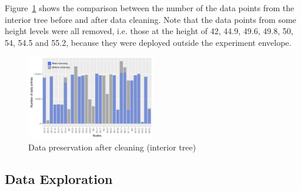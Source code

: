\documentclass[11pt]{article}
\begin{document}
Figure~\ref{fig:dataCleaning} shows the comparison between the number of the data points from the interior tree before and after data cleaning. Note that the data points from some height levels were all removed, i.e. those at the height of 42, 44.9, 49.6, 49.8, 50, 54, 54.5 and 55.2, because they were deployed outside the experiment envelope.
\begin{figure}[!htb]
  \centering
    \includegraphics[width=0.5\textwidth]{../figures/dataCleaning.png}
  \caption{Data preservation after cleaning (interior tree)}
  \label{fig:dataCleaning}
\end{figure}


\subsection{Data Exploration}
\end{document}
